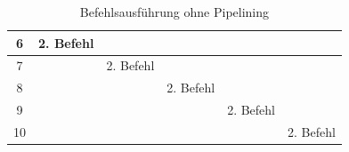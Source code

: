 \documentclass[a4paper,12pt]{article}
\begin{document}
\begin{table}[!htb]
\begin{tabular}{|c|l|l|l|l|l|}
6    & 2. Befehl                                                                        &                                 &                                                                                 &                                &                                                                                            \\ \hline
7    &                                                                                  & 2. Befehl                       &                                                                                 &                                &                                                                                            \\ \hline
8    &                                                                                  &                                 & 2. Befehl                                                                       &                                &                                                                                            \\ \hline
9    &                                                                                  &                                 &                                                                                 & 2. Befehl                      &                                                                                            \\ \hline
10   &                                                                                  &                                 &                                                                                 &                                & 2. Befehl                                                                                  \\ \hline


\end{tabular}
\caption{Befehlsausführung ohne Pipelining \protect\cite{mikroprozessortechnik2011}}
\label{noPipeline}
\end{table}
\end{document}
